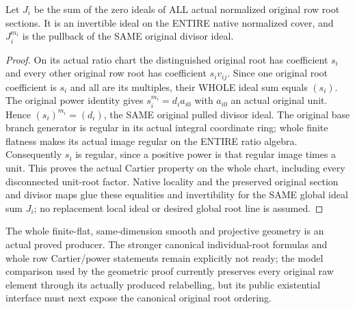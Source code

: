 \begin{lemma}
\label{lem:kn-nadel-whole-original-row-root-ideal}
\notready
Let $J_i$ be the sum of the zero ideals of ALL actual normalized original row
root sections. It is an invertible ideal on the ENTIRE native normalized
cover, and $J_i^{m_i}$ is the pullback of the SAME original divisor ideal.
\end{lemma}
\begin{proof}
On its actual ratio chart the distinguished original root has coefficient
$s_i$ and every other original row root has coefficient $s_i v_{ij}$. Since
one original root coefficient is $s_i$ and all are its multiples, their WHOLE
ideal sum equals $(s_i)$. The original power identity gives
$s_i^{m_i}=d_i a_{i0}$ with $a_{i0}$ an actual original unit. Hence
$(s_i)^{m_i}=(d_i)$, the SAME original pulled divisor ideal. The original
base branch generator is regular in its actual integral coordinate ring;
whole finite flatness makes its actual image regular on the ENTIRE ratio
algebra. Consequently $s_i$ is regular, since a positive power is that regular
image times a unit. This proves the actual Cartier property on the whole
chart, including every disconnected unit-root factor. Native locality and
the preserved original section and divisor maps glue these equalities and
invertibility for the SAME global ideal sum $J_i$; no replacement local ideal
or desired global root line is assumed.
\end{proof}

The whole finite-flat, same-dimension smooth and projective geometry is an
actual proved producer. The stronger canonical individual-root formulas and
whole row Cartier/power statements remain explicitly not ready; the model
comparison used by the geometric proof currently preserves every original
raw element through its actually produced relabelling, but its public
existential interface must next expose the canonical original root ordering.
